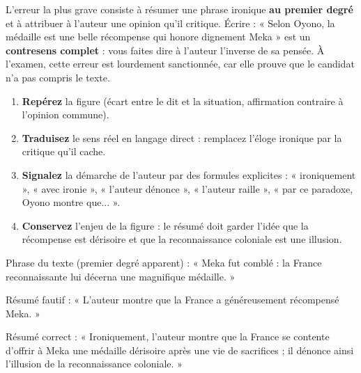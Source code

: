 \documentclass[11pt]{article}
\begin{document}
\begin{attention}
L'erreur la plus grave consiste à résumer une phrase ironique \textbf{au premier degré} et à attribuer à l'auteur une opinion qu'il critique. Écrire : « Selon Oyono, la médaille est une belle récompense qui honore dignement Meka » est un \textbf{contresens complet} : vous faites dire à l'auteur l'inverse de sa pensée. À l'examen, cette erreur est lourdement sanctionnée, car elle prouve que le candidat n'a pas compris le texte.
\end{attention}

\begin{methode}
\begin{enumerate}
\item \textbf{Repérez} la figure (écart entre le dit et la situation, affirmation contraire à l'opinion commune).
\item \textbf{Traduisez} le sens réel en langage direct : remplacez l'éloge ironique par la critique qu'il cache.
\item \textbf{Signalez} la démarche de l'auteur par des formules explicites : « ironiquement », « avec ironie », « l'auteur dénonce », « l'auteur raille », « par ce paradoxe, Oyono montre que... ».
\item \textbf{Conservez} l'enjeu de la figure : le résumé doit garder l'idée que la récompense est dérisoire et que la reconnaissance coloniale est une illusion.
\end{enumerate}
\end{methode}

\begin{exemplebox}
Phrase du texte (premier degré apparent) : « Meka fut comblé : la France reconnaissante lui décerna une magnifique médaille. »\par
Résumé fautif : « L'auteur montre que la France a généreusement récompensé Meka. »\par
Résumé correct : « Ironiquement, l'auteur montre que la France se contente d'offrir à Meka une médaille dérisoire après une vie de sacrifices ; il dénonce ainsi l'illusion de la reconnaissance coloniale. »
\end{exemplebox}
\end{document}
